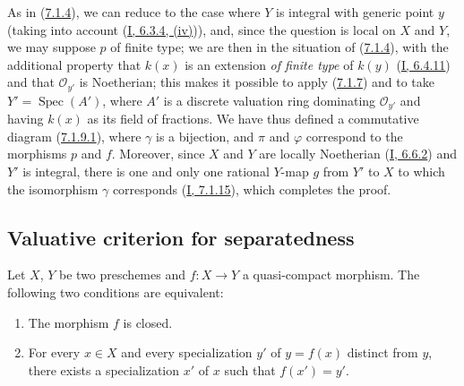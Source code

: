 As in (\hyperref[II.7.1.4]{7.1.4}), we can reduce to the case where $Y$
is integral with generic point $y$ (taking into account
(\hyperref[I.6.3.4]{I, 6.3.4, (iv)})), and, since the question is local on
$X$ and $Y$, we may suppose $p$ of finite type; we are then in the situation
of (\hyperref[II.7.1.4]{7.1.4}), with the additional property that
$k(x)$ is an extension \emph{of finite type} of $k(y)$
(\hyperref[I.6.4.11]{I, 6.4.11}) and that $\mathcal{O}_{y'}$ is Noetherian;
this makes it possible to apply (\hyperref[II.7.1.7]{7.1.7}) and to take
$Y'=\operatorname{Spec}(A')$, where $A'$ is a discrete valuation ring
dominating $\mathcal{O}_{y'}$ and having $k(x)$ as its field of fractions. We
have thus defined a commutative diagram
(\hyperref[II.7.1.9.1]{7.1.9.1}), where $\gamma$ is a bijection, and $\pi$
and $\varphi$ correspond to the morphisms $p$ and $f$. Moreover, since $X$ and
$Y$ are locally Noetherian (\hyperref[I.6.6.2]{I, 6.6.2}) and $Y'$
is integral, there is one and only one rational $Y$-map $g$ from $Y'$
to $X$ to which the isomorphism $\gamma$ corresponds
(\hyperref[I.7.1.15]{I, 7.1.15}), which completes the proof.

\subsection{Valuative criterion for separatedness}
\label{subsection:II.7.2}

\begin{proposition}[7.2.1]
\label{II.7.2.1}
Let $X$, $Y$ be two preschemes and $f:X\to Y$ a quasi-compact morphism. The
following two conditions are equivalent:
\begin{enumerate}
\item[\rm a)] The morphism $f$ is closed.
\item[\rm b)] For every $x\in X$ and every specialization $y'$ of $y=f(x)$
distinct from $y$, there exists a specialization $x'$ of $x$ such that
$f(x')=y'$.
\end{enumerate}
\end{proposition}

